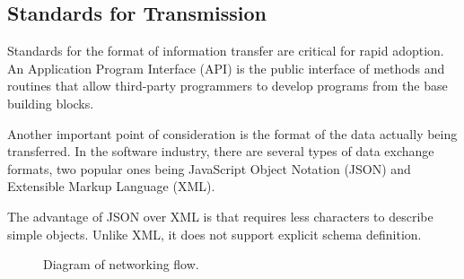 \subsection{Standards for Transmission}

Standards for the format of information transfer are critical for rapid
adoption. An Application  Program Interface (API) is the public
interface of methods and routines that allow third-party programmers to
develop programs from the base building blocks. 

Another important point of consideration is the format of the data
actually being transferred. In the software industry, there are several
types of data exchange formats, two popular ones being JavaScript Object
Notation (JSON) and Extensible Markup Language (XML). 

The advantage of JSON over XML is that requires less characters to
describe simple objects. Unlike XML, it does not support explicit schema
definition. 

\begin{figure}
\caption{Diagram of networking flow.}
\label{fig:NetworkFlow}
\end{figure}


